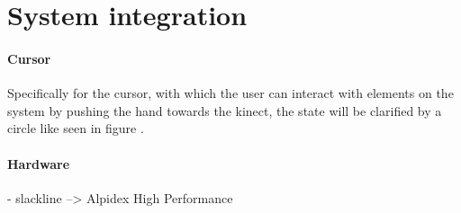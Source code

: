 \chapter{System integration}

\subsubsection{Cursor}
Specifically for the cursor, with which the user can interact with elements on the system by pushing the hand towards the kinect, the state will be clarified by a circle like seen in figure .

\subsubsection{Hardware}
- slackline --> Alpidex High Performance
